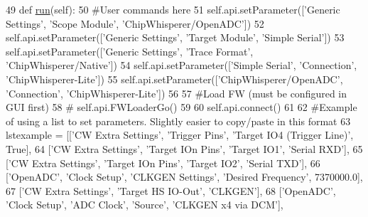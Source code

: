 \begin{DoxyCode}
49     \textcolor{keyword}{def }\hyperlink{classsoftware_1_1chipwhisperer_1_1capture_1_1scripts_1_1cwlite-simpleserialxmega-spa_1_1UserScript_adde3063375b3a810694dfd274ad52d4f}{run}(self):
50         \textcolor{comment}{#User commands here}
51         self.api.setParameter([\textcolor{stringliteral}{'Generic Settings'}, \textcolor{stringliteral}{'Scope Module'}, \textcolor{stringliteral}{'ChipWhisperer/OpenADC'}])
52         self.api.setParameter([\textcolor{stringliteral}{'Generic Settings'}, \textcolor{stringliteral}{'Target Module'}, \textcolor{stringliteral}{'Simple Serial'}])
53         self.api.setParameter([\textcolor{stringliteral}{'Generic Settings'}, \textcolor{stringliteral}{'Trace Format'}, \textcolor{stringliteral}{'ChipWhisperer/Native'}])
54         self.api.setParameter([\textcolor{stringliteral}{'Simple Serial'}, \textcolor{stringliteral}{'Connection'}, \textcolor{stringliteral}{'ChipWhisperer-Lite'}])
55         self.api.setParameter([\textcolor{stringliteral}{'ChipWhisperer/OpenADC'}, \textcolor{stringliteral}{'Connection'}, \textcolor{stringliteral}{'ChipWhisperer-Lite'}])
56 
57         \textcolor{comment}{#Load FW (must be configured in GUI first)}
58         \textcolor{comment}{# self.api.FWLoaderGo()}
59                 
60         self.api.connect()
61 
62         \textcolor{comment}{#Example of using a list to set parameters. Slightly easier to copy/paste in this format}
63         lstexample = [[\textcolor{stringliteral}{'CW Extra Settings'}, \textcolor{stringliteral}{'Trigger Pins'}, \textcolor{stringliteral}{'Target IO4 (Trigger Line)'}, \textcolor{keyword}{True}],
64                       [\textcolor{stringliteral}{'CW Extra Settings'}, \textcolor{stringliteral}{'Target IOn Pins'}, \textcolor{stringliteral}{'Target IO1'}, \textcolor{stringliteral}{'Serial RXD'}],
65                       [\textcolor{stringliteral}{'CW Extra Settings'}, \textcolor{stringliteral}{'Target IOn Pins'}, \textcolor{stringliteral}{'Target IO2'}, \textcolor{stringliteral}{'Serial TXD'}],
66                       [\textcolor{stringliteral}{'OpenADC'}, \textcolor{stringliteral}{'Clock Setup'}, \textcolor{stringliteral}{'CLKGEN Settings'}, \textcolor{stringliteral}{'Desired Frequency'}, 7370000.0],
67                       [\textcolor{stringliteral}{'CW Extra Settings'}, \textcolor{stringliteral}{'Target HS IO-Out'}, \textcolor{stringliteral}{'CLKGEN'}],
68                       [\textcolor{stringliteral}{'OpenADC'}, \textcolor{stringliteral}{'Clock Setup'}, \textcolor{stringliteral}{'ADC Clock'}, \textcolor{stringliteral}{'Source'}, \textcolor{stringliteral}{'CLKGEN x4 via DCM'}],

\end{DoxyCode}
